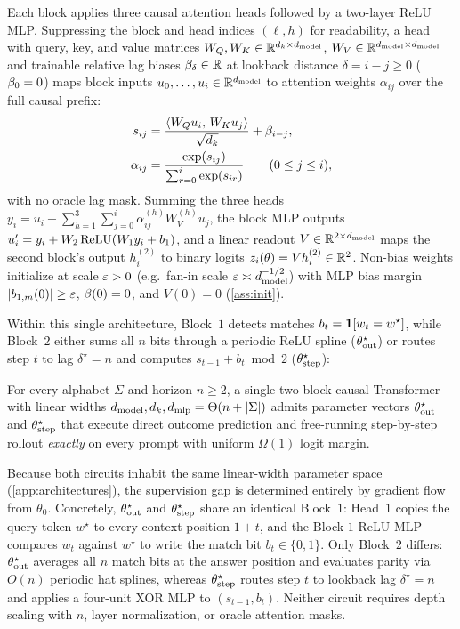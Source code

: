 Each block applies three causal attention heads followed by a two-layer ReLU MLP. Suppressing the block and head indices $(\ell, h)$ for readability, a head with query, key, and value matrices $W_Q, W_K \in \mathbb R^{d_k \times d_{\mathrm{model}}}$, $W_V \in \mathbb R^{d_{\mathrm{model}} \times d_{\mathrm{model}}}$ and trainable relative lag biases $\beta_\delta \in \mathbb R$ at lookback distance $\delta = i - j \ge 0$ ($\beta_0 = 0$) maps block inputs $u_0, \ldots, u_i \in \mathbb R^{d_{\mathrm{model}}}$ to attention weights $\alpha_{ij}$ over the full causal prefix:
\begin{equation}
  \begin{aligned}
  s_{ij} &= \frac{\langle W_Q u_i,\, W_K u_j\rangle}{\sqrt{d_k}} + \beta_{i-j},\\
  \alpha_{ij} &= \frac{\exp(s_{ij})}{\sum_{r=0}^i \exp(s_{ir})} \qquad (0 \le j \le i),
  \end{aligned}
  \label{eq:causal-attn}
\end{equation}
with no oracle lag mask. Summing the three heads $y_i = u_i + \sum_{h=1}^3 \sum_{j=0}^i \alpha_{ij}^{(h)} W_V^{(h)} u_j$, the block MLP outputs $u_i' = y_i + W_2\operatorname{ReLU}(W_1 y_i + b_1)$, and a linear readout $V \in \mathbb R^{2 \times d_{\mathrm{model}}}$ maps the second block's output $h_i^{(2)}$ to binary logits $z_i(\theta) = V h_i^{(2)} \in \mathbb R^2$. Non-bias weights initialize at scale $\varepsilon > 0$ (e.g.\ fan-in scale $\varepsilon \asymp d_{\mathrm{model}}^{-1/2}$) with MLP bias margin $|b_{1,m}(0)| \ge \varepsilon$, $\beta(0) = 0$, and $V(0) = 0$ (\cref{ass:init}).

Within this single architecture, Block~$1$ detects matches $b_t = \mathbf 1[w_t = w^\star]$, while Block~$2$ either sums all $n$ bits through a periodic ReLU spline ($\theta^\star_{\mathrm{out}}$) or routes step $t$ to lag $\delta^\star = n$ and computes $s_{t-1} + b_t \bmod 2$ ($\theta^\star_{\mathrm{step}}$):

\begin{proposition}
\label{prop:represent}
For every alphabet $\Sigma$ and horizon $n \ge 2$, a single two-block causal Transformer with linear widths $d_{\mathrm{model}}, d_k, d_{\mathrm{mlp}} = \Theta(n + |\Sigma|)$ admits parameter vectors $\theta^\star_{\mathrm{out}}$ and $\theta^\star_{\mathrm{step}}$ that execute direct outcome prediction and free-running step-by-step rollout \emph{exactly} on every prompt with uniform $\Omega(1)$ logit margin.
\end{proposition}

Because both circuits inhabit the same linear-width parameter space (\cref{app:architectures}), the supervision gap is determined entirely by gradient flow from $\theta_0$. Concretely, $\theta^\star_{\mathrm{out}}$ and $\theta^\star_{\mathrm{step}}$ share an identical Block~$1$: Head~$1$ copies the query token $w^\star$ to every context position $1+t$, and the Block-$1$ ReLU MLP compares $w_t$ against $w^\star$ to write the match bit $b_t \in \{0,1\}$. Only Block~$2$ differs: $\theta^\star_{\mathrm{out}}$ averages all $n$ match bits at the answer position and evaluates parity via $O(n)$ periodic hat splines, whereas $\theta^\star_{\mathrm{step}}$ routes step $t$ to lookback lag $\delta^\star = n$ and applies a four-unit XOR MLP to $(s_{t-1}, b_t)$. Neither circuit requires depth scaling with $n$, layer normalization, or oracle attention masks.

